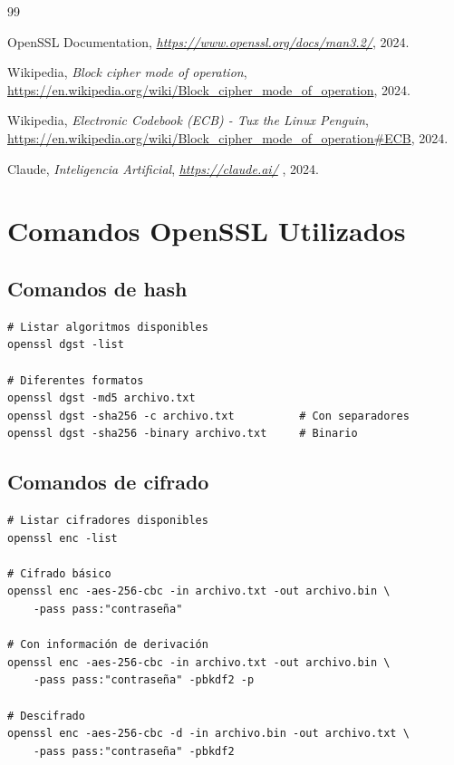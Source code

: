 \documentclass[12pt,a4paper]{report}
\begin{document}
\begin{thebibliography}{99}

 OpenSSL Documentation, \textit{\url{https://www.openssl.org/docs/man3.2/}}, 2024.

 Wikipedia, \textit{Block cipher mode of operation}, \url{https://en.wikipedia.org/wiki/Block_cipher_mode_of_operation}, 2024.

 Wikipedia, \textit{Electronic Codebook (ECB) - Tux the Linux Penguin}, \url{https://en.wikipedia.org/wiki/Block_cipher_mode_of_operation#ECB}, 2024.

 Claude, \textit{Inteligencia Artificial}, \textit{\url{https://claude.ai/}} , 2024.

\end{thebibliography}


\appendix

\chapter{Comandos OpenSSL Utilizados}

\section{Comandos de hash}

\begin{lstlisting}[caption=Comandos para resúmenes]
# Listar algoritmos disponibles
openssl dgst -list

# Diferentes formatos
openssl dgst -md5 archivo.txt
openssl dgst -sha256 -c archivo.txt          # Con separadores
openssl dgst -sha256 -binary archivo.txt     # Binario
\end{lstlisting}

\section{Comandos de cifrado}

\begin{lstlisting}[caption=Comandos para cifrado simétrico]
# Listar cifradores disponibles
openssl enc -list

# Cifrado básico
openssl enc -aes-256-cbc -in archivo.txt -out archivo.bin \
    -pass pass:"contraseña"

# Con información de derivación
openssl enc -aes-256-cbc -in archivo.txt -out archivo.bin \
    -pass pass:"contraseña" -pbkdf2 -p

# Descifrado
openssl enc -aes-256-cbc -d -in archivo.bin -out archivo.txt \
    -pass pass:"contraseña" -pbkdf2
\end{lstlisting}
\end{document}
